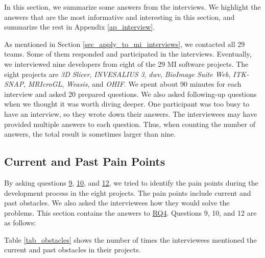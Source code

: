 \documentclass[preprint,12pt,authoryear]{elsarticle}
\begin{document}
In this section, we summarize some answers from the interviews. We highlight the
answers that are the most informative and interesting in this section, and
summarize the rest in Appendix \ref{ap_interview}.

As mentioned in Section \ref{sec_apply_to_mi_interviews}, we contacted all 29
teams. Some of them responded and participated in the interviews. Eventually, we
interviewed nine developers from eight of the 29 MI software projects. The eight
projects are \textit{3D Slicer}, \textit{INVESALIUS 3}, \textit{dwv},
\textit{BioImage Suite Web}, \textit{ITK-SNAP}, \textit{MRIcroGL},
\textit{Weasis}, and \textit{OHIF}. We spent about 90 minutes for each interview
and asked 20 prepared questions. We also asked following-up questions when we
thought it was worth diving deeper. One participant was too busy to have an
interview, so they wrote down their answers. The interviewees may have provided
multiple answers to each question. Thus, when counting the number of answers,
the total result is sometimes larger than nine.

\subsection{Current and Past Pain Points} \label{sec_interview_pain_points}

By asking questions \hyperlink{q9}{9}, \hyperlink{q10}{10}, and
\hyperlink{q12}{12}, we tried to identify the pain points during the development
process in the eight projects. The pain points include current and past
obstacles. We also asked the interviewees how they would solve the problems.
This section contains the answers to \hyperlink{rq4}{RQ4}. Questions 9, 10, and
12 are as follows:


Table \ref{tab_obstacles} shows the number of times the interviewees mentioned
the current and past obstacles in their projects.
\end{document}
